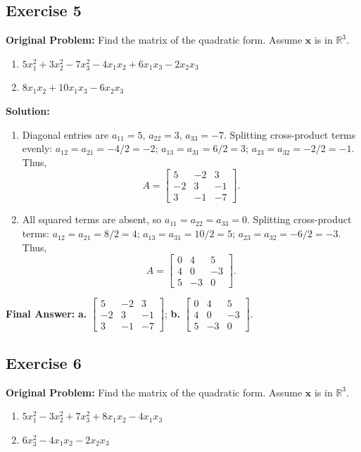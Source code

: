 \documentclass[11pt, letterpaper]{article}
\theoremstyle{definition}
\theoremstyle{remark}
\begin{document}
\hrulefill

\subsection*{Exercise 5}
\textbf{Original Problem:} Find the matrix of the quadratic form. Assume $\mathbf{x}$ is in $\mathbb{R}^3$.
\begin{enumerate}[label=\alph*.]
    \item $5x_1^2 + 3x_2^2 - 7x_3^2 - 4x_1x_2 + 6x_1x_3 - 2x_2x_3$
    \item $8x_1x_2 + 10x_1x_3 - 6x_2x_3$
\end{enumerate}

\textbf{Solution:}
\begin{enumerate}[label=\alph*.]
    \item Diagonal entries are $a_{11} = 5$, $a_{22} = 3$, $a_{33} = -7$. Splitting cross-product terms evenly: $a_{12} = a_{21} = -4/2 = -2$; $a_{13} = a_{31} = 6/2 = 3$; $a_{23} = a_{32} = -2/2 = -1$. Thus,
    \[
    A = \begin{bmatrix} 5 & -2 & 3 \\ -2 & 3 & -1 \\ 3 & -1 & -7 \end{bmatrix}.
    \]
    \item All squared terms are absent, so $a_{11} = a_{22} = a_{33} = 0$. Splitting cross-product terms: $a_{12} = a_{21} = 8/2 = 4$; $a_{13} = a_{31} = 10/2 = 5$; $a_{23} = a_{32} = -6/2 = -3$. Thus,
    \[
    A = \begin{bmatrix} 0 & 4 & 5 \\ 4 & 0 & -3 \\ 5 & -3 & 0 \end{bmatrix}.
    \]
\end{enumerate}
\textbf{Final Answer:} \textbf{a.} $\begin{bmatrix} 5 & -2 & 3 \\ -2 & 3 & -1 \\ 3 & -1 & -7 \end{bmatrix}$; \quad \textbf{b.} $\begin{bmatrix} 0 & 4 & 5 \\ 4 & 0 & -3 \\ 5 & -3 & 0 \end{bmatrix}$.

\hrulefill

\subsection*{Exercise 6}
\textbf{Original Problem:} Find the matrix of the quadratic form. Assume $\mathbf{x}$ is in $\mathbb{R}^3$.
\begin{enumerate}[label=\alph*.]
    \item $5x_1^2 - 3x_2^2 + 7x_3^2 + 8x_1x_2 - 4x_1x_3$
    \item $6x_3^2 - 4x_1x_2 - 2x_2x_3$
\end{enumerate}
\end{document}

